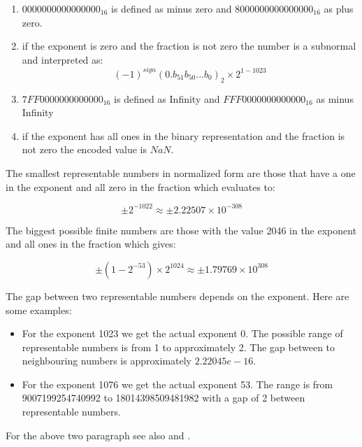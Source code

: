 \begin{enumerate}
\item $0000 0000 0000 0000_{16}$ is defined as minus zero and $8000 0000 0000 0000_{16}$ as plus zero.
\item if the exponent is zero and the fraction is not zero the number is a subnormal and interpreted as:
\begin{equation}
(-1)^{sign}(0.b_{51}b_{50}...b_{0})_{2} \times 2^{1-1023} 
\end{equation}
\item $7FF0 0000 0000 0000_{16}$ is defined as Infinity and $FFF0 0000 0000 0000_{16}$ as minus Infinity
\item if the exponent has all ones in the binary representation and the fraction is not zero the encoded value is $NaN$.
\end{enumerate}

The smallest representable numbers in normalized form are those that have a one in the exponent and all zero in the fraction which evaluates to:

\begin{equation}
	\pm 2^{-1022} \approx \pm 2.22507 \times 10^{-308}
\end{equation}

The biggest possible finite numbers are those with the value 2046 in the exponent and all ones in the fraction which gives:

\begin{equation}
	\pm (1-2^{-53}) \times 2^{1024} \approx \pm 1.79769 \times 10^{308}
\end{equation}

The gap between two representable numbers depends on the exponent. Here are some examples:
\begin{itemize}
 \item	For the exponent 1023 we get the actual exponent 0. The possible range of representable numbers is from 1 to approximately 2. The gap between to neighbouring numbers is approximately $2.22045e-16$.
 \item For the exponent 1076 we get the actual exponent 53. The range is from 9007199254740992 to 18014398509481982 with a gap of 2 between representable numbers.
\end{itemize}

For the above two paragraph see also \cite{wiki:double_precision_floating_point} and \cite{wiki:ieee_745_1985}.

